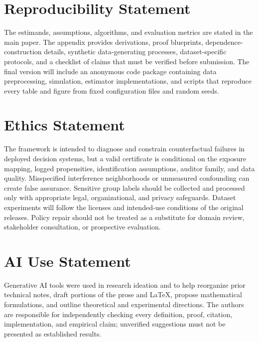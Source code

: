 \documentclass{article}
\theoremstyle{plain}
\theoremstyle{definition}
\theoremstyle{remark}
\begin{document}









\section*{Reproducibility Statement}
The estimands, assumptions, algorithms, and evaluation metrics are stated in the main paper. The appendix provides derivations, proof blueprints, dependence-construction details, synthetic data-generating processes, dataset-specific protocols, and a checklist of claims that must be verified before submission. The final version will include an anonymous code package containing data preprocessing, simulation, estimator implementations, and scripts that reproduce every table and figure from fixed configuration files and random seeds.

\section*{Ethics Statement}
The framework is intended to diagnose and constrain counterfactual failures in deployed decision systems, but a valid certificate is conditional on the exposure mapping, logged propensities, identification assumptions, auditor family, and data quality. Misspecified interference neighborhoods or unmeasured confounding can create false assurance. Sensitive group labels should be collected and processed only with appropriate legal, organizational, and privacy safeguards. Dataset experiments will follow the licenses and intended-use conditions of the original releases. Policy repair should not be treated as a substitute for domain review, stakeholder consultation, or prospective evaluation.

\section*{AI Use Statement}
Generative AI tools were used in research ideation and to help reorganize prior technical notes, draft portions of the prose and LaTeX, propose mathematical formulations, and outline theoretical and experimental directions. The authors are responsible for independently checking every definition, proof, citation, implementation, and empirical claim; unverified suggestions must not be presented as established results.




\appendix

\end{document}
